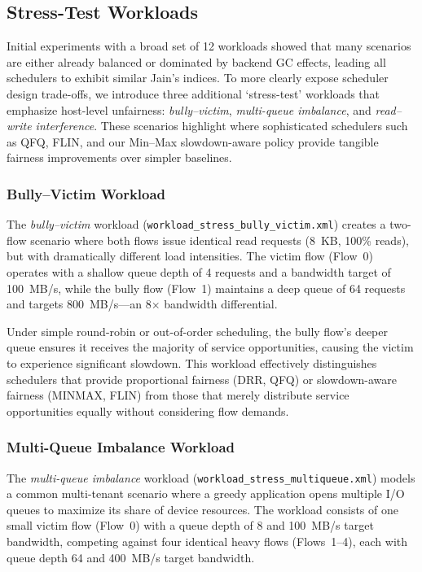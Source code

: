 \subsection{Stress-Test Workloads}

Initial experiments with a broad set of 12 workloads showed that many scenarios are either already balanced or dominated by backend GC effects, leading all schedulers to exhibit similar Jain's indices. To more clearly expose scheduler design trade-offs, we introduce three additional `stress-test' workloads that emphasize host-level unfairness: \emph{bully--victim}, \emph{multi-queue imbalance}, and \emph{read--write interference}. These scenarios highlight where sophisticated schedulers such as QFQ, FLIN, and our Min--Max slowdown-aware policy provide tangible fairness improvements over simpler baselines.

\subsubsection{Bully--Victim Workload}

The \emph{bully--victim} workload (\texttt{workload\_stress\_bully\_victim.xml}) creates a two-flow scenario where both flows issue identical read requests (8~KB, 100\% reads), but with dramatically different load intensities. The victim flow (Flow~0) operates with a shallow queue depth of 4 requests and a bandwidth target of 100~MB/s, while the bully flow (Flow~1) maintains a deep queue of 64 requests and targets 800~MB/s---an 8$\times$ bandwidth differential.

Under simple round-robin or out-of-order scheduling, the bully flow's deeper queue ensures it receives the majority of service opportunities, causing the victim to experience significant slowdown. This workload effectively distinguishes schedulers that provide proportional fairness (DRR, QFQ) or slowdown-aware fairness (MINMAX, FLIN) from those that merely distribute service opportunities equally without considering flow demands.

\subsubsection{Multi-Queue Imbalance Workload}

The \emph{multi-queue imbalance} workload (\texttt{workload\_stress\_multiqueue.xml}) models a common multi-tenant scenario where a greedy application opens multiple I/O queues to maximize its share of device resources. The workload consists of one small victim flow (Flow~0) with a queue depth of 8 and 100~MB/s target bandwidth, competing against four identical heavy flows (Flows~1--4), each with queue depth 64 and 400~MB/s target bandwidth.

